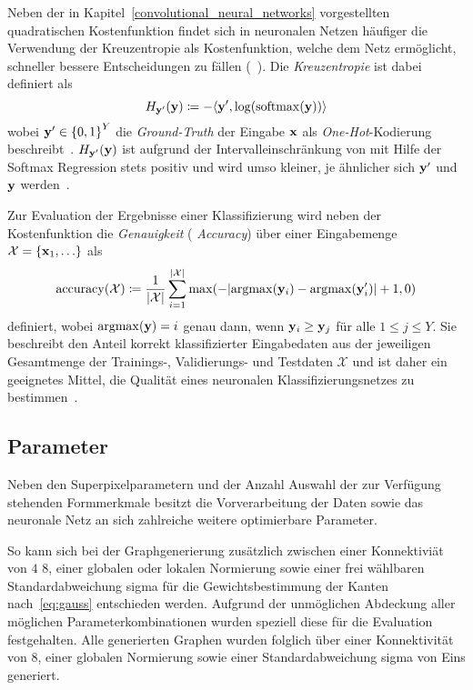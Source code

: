 Neben der in Kapitel~\ref{convolutional_neural_networks} vorgestellten quadratischen Kostenfunktion findet sich in neuronalen Netzen häufiger die Verwendung der Kreuzentropie als Kostenfunktion, welche dem Netz ermöglicht, schneller bessere Entscheidungen zu fällen (\vgl{}~\cite{Nielsen}).
Die \emph{Kreuzentropie} ist dabei definiert als
\begin{equation*}
  H_{\ve{y}^{\prime}}\left(\ve{y}\right) \coloneqq - \left\langle \ve{y}^{\prime}, \log\left(\mathrm{softmax}\left(\ve{y}\right)\right)\right\rangle
\end{equation*}
wobei $\ve{y}^{\prime} \in {\left\{ 0, 1 \right\}}^Y$ die \emph{Ground-Truth} der Eingabe $\mathbf{x}$ als \emph{One-Hot}-Kodierung beschreibt~\cite{tensorflow, Nielsen}.
$H_{\ve{y}^{\prime}}\left(\ve{y}\right)$ ist aufgrund der Intervalleinschränkung von  mit Hilfe der Softmax Regression stets positiv und wird umso kleiner, je ähnlicher sich $\mathbf{y}^{\prime}$ und $\mathbf{y}$ werden~\cite{Nielsen}.

Zur Evaluation der Ergebnisse einer Klassifizierung wird neben der Kostenfunktion die \emph{Genauigkeit} (\engl{} \emph{Accuracy}) über einer Eingabemenge $\mathcal{X} = \left\{\ve{x}_1, \ldots \right\}$ als
\begin{equation*}
  \mathrm{accuracy}\left(\mathcal{X}\right) \coloneqq \frac{1}{\left|\mathcal{X}\right|}\sum_{i = 1}^{\left|\mathcal{X}\right|}  \max \left( - \left| \mathrm{argmax}\left(\ve{y}_i\right) - \mathrm{argmax}\left(\ve{y}^{\prime}_i\right) \right| + 1, 0 \right)
\end{equation*}
definiert, wobei $\mathrm{argmax}\left(\ve{y}\right) = i$ genau dann, wenn $\mathbf{y}_i \geq \mathbf{y}_j$ für alle $1 \leq j \leq Y$.
Sie beschreibt den Anteil korrekt klassifizierter Eingabedaten aus der jeweiligen Gesamtmenge der Trainings-, Validierungs- und Testdaten $\mathcal{X}$ und ist daher ein geeignetes Mittel, die Qualität eines neuronalen Klassifizierungsnetzes zu bestimmen~\cite{Nielsen}.

\subsection{Parameter}
\label{parameter}

Neben den Superpixelparametern und der Anzahl \bzw{} Auswahl der zur Verfügung stehenden Formmerkmale besitzt die Vorverarbeitung der Daten sowie das neuronale Netz an sich zahlreiche weitere optimierbare Parameter.

So kann sich \zB{} bei der Graphgenerierung zusätzlich zwischen einer Konnektiviät von $4$ \bzw{} $8$, einer globalen oder lokalen Normierung sowie einer frei wählbaren Standardabweichung \gls{sigma} für die Gewichtsbestimmung der Kanten nach~\eqref{eq:gauss} entschieden werden.
Aufgrund der unmöglichen Abdeckung aller möglichen Parameterkombinationen wurden speziell diese für die Evaluation festgehalten.
Alle generierten Graphen wurden folglich über einer Konnektivität von $8$, einer globalen Normierung sowie einer Standardabweichung \gls{sigma} von Eins generiert.

